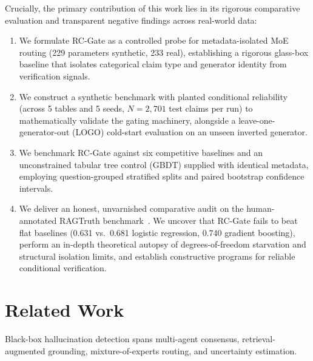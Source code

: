 \documentclass[pdflatex,sn-mathphys,Numbered]{sn-jnl}
\begin{document}
Crucially, the primary contribution of this work lies in its rigorous comparative evaluation and transparent negative findings across real-world data:
\begin{enumerate}
    \item We formulate RC-Gate as a controlled probe for metadata-isolated MoE routing (229 parameters synthetic, 233 real), establishing a rigorous glass-box baseline that isolates categorical claim type and generator identity from verification signals.
    \item We construct a synthetic benchmark with planted conditional reliability (across 5 tables and 5 seeds, $N = 2{,}701$ test claims per run) to mathematically validate the gating machinery, alongside a leave-one-generator-out (LOGO) cold-start evaluation on an unseen inverted generator.
    \item We benchmark RC-Gate against six competitive baselines and an unconstrained tabular tree control (GBDT) supplied with identical metadata, employing question-grouped stratified splits and paired bootstrap confidence intervals.
    \item We deliver an honest, unvarnished comparative audit on the human-annotated RAGTruth benchmark~\cite{niu2024ragtruth}. We uncover that RC-Gate fails to beat flat baselines (0.631 vs.\ 0.681 logistic regression, 0.740 gradient boosting), perform an in-depth theoretical autopsy of degrees-of-freedom starvation and structural isolation limits, and establish constructive programs for reliable conditional verification.
\end{enumerate}

\section{Related Work}\label{sec:related}

Black-box hallucination detection spans multi-agent consensus, retrieval-augmented grounding, mixture-of-experts routing, and uncertainty estimation.
\end{document}
